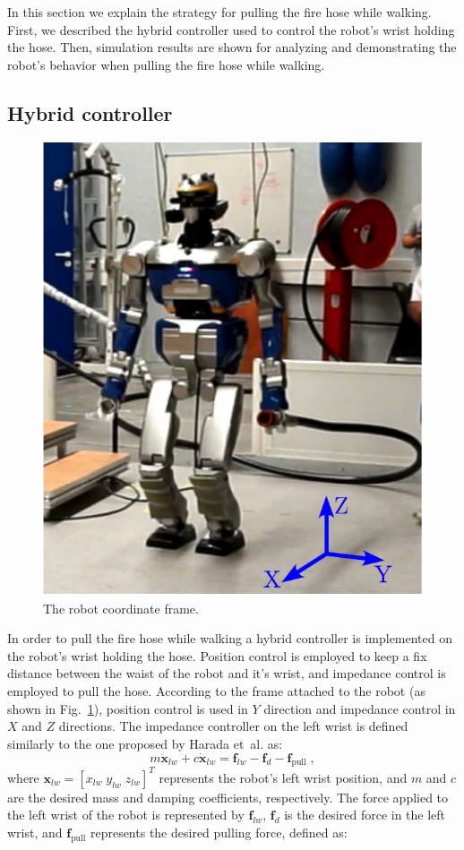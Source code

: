 In this section we explain the strategy for pulling the fire hose while walking.
%
First, we described the hybrid controller used to control the robot's wrist holding the hose.
%
Then, simulation results are shown for analyzing and demonstrating the robot's behavior when pulling the fire hose while walking.





\subsection{Hybrid controller}			\label{pulling}

\begin{figure}[ht]
 \centering
 \includegraphics[height=0.40\textwidth]{./figures/coordinates.pdf}
 \vspace{-4mm}
 \caption{The robot coordinate frame.}
 \label{frame}
\end{figure}
%
In order to pull the fire hose while walking a hybrid controller is implemented on the robot's wrist holding the hose.
%
Position control is employed to keep a fix distance between the waist of the robot and it's wrist, and impedance control is employed to pull the hose.
%
According to the frame attached to the robot (as shown in Fig.~\ref{frame}), position control is used in $Y$ direction and impedance control in $X$ and $Z$ directions.
%
%
%
%
% 
%
The impedance controller on the left wrist is defined similarly to the one proposed by Harada et~al. \cite{pushRealTime} as:  
%
\begin{equation}
m\mathbf{\ddot{x}}_{lw} + c\mathbf{\dot{x}}_{lw} = \mathbf{f}_{lw} - \mathbf{f}_d - \mathbf{f}_{\text{pull}} \; ,
\label{eq_imp}
\end{equation}
%
where $\mathbf{x}_{lw} = [x_{lw} \; y_{lw} \; z_{lw}]^T$ represents the robot's left wrist position, and $m$ and $c$ are the desired mass and damping coefficients, respectively.
%
The force applied to the left wrist of the robot is represented by $\mathbf{f}_{lw}$, $\mathbf{f}_d$ is the desired force in the left wrist, and $\mathbf{f}_{\text{pull}}$ represents the desired pulling force, defined as:

